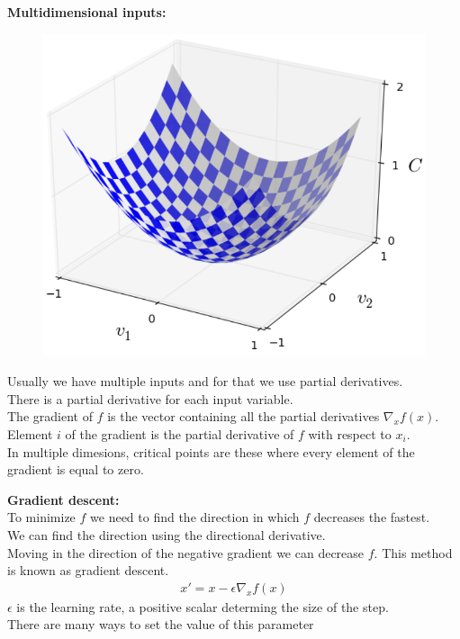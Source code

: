\documentclass[10pt, compress]{beamer}
\begin{document}
\begin{frame}
  \textbf{Multidimensional inputs:}
  \vspace{1cm}
  \begin{multicols}{2}
    \begin{figure}
      \includegraphics[width=1\linewidth]{imgs/gd_1}
    \end{figure}
   

    \columnbreak
 
  Usually we have multiple inputs and for that we use partial derivatives.\\ 
  There is a partial derivative for each input variable. \\
  The gradient of $f$ is the vector containing all the partial derivatives $\nabla_x f(x)$. Element $i$ of the gradient is the partial derivative of $f$ with respect to $x_i$. \\
  In multiple dimesions, critical points are these where every element of the gradient is equal to zero.
\end{multicols}
\end{frame}

\begin{frame}
  \textbf{Gradient descent:}\\
  To minimize $f$ we need to find the direction in which $f$ decreases the fastest.\\
  We can find the direction using the directional derivative. \\
  Moving in the direction of the negative gradient we can decrease $f$.
  This method is known as gradient descent.\\
  \begin{eqnarray}
    x' = x - \epsilon \nabla_xf(x)
    \nonumber
  \end{eqnarray}
  $\epsilon$ is the learning rate, a positive scalar determing the size of the step.\\
  There are many ways to set the value of this parameter\\
 
  
\end{frame}
  
\end{document}
